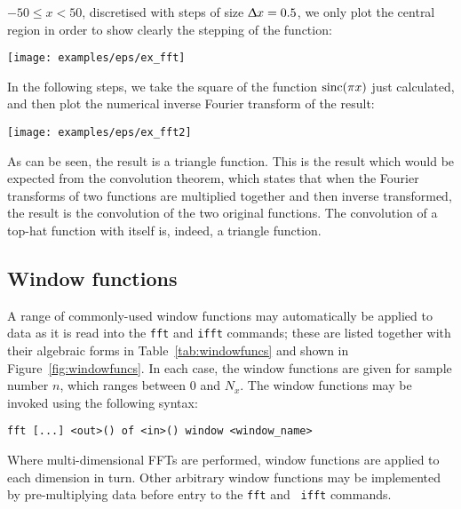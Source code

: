 {$-50\leq x<50$, discretised with steps of size $\Updelta x=0.5$, we only plot
the central region in order to show clearly the stepping of the function:
\nlscf
\begin{center}
\texttt{[image: examples/eps/ex\_fft]}
\end{center}
\nlscf
In the following steps, we take the square of the function ${\rm sinc}(\pi x)$ just
calculated, and then plot the numerical inverse Fourier transform of the
result:
\nlscf
{}\newline
{}\newline
{}
\nlscf
\begin{center}
\texttt{[image: examples/eps/ex\_fft2]}
\end{center}
\nlscf
As can be seen, the result is a triangle function. This is the result which
would be expected from the convolution theorem, which states that when the
Fourier transforms of two functions are multiplied together and then inverse
transformed, the result is the convolution of the two original functions. The
convolution of a top-hat function with itself is, indeed, a triangle function.
}

\subsection{Window functions}

A range of commonly-used window functions may automatically be applied to data
as it is read into the {\tt fft} and {\tt ifft} commands; these are listed
together with their algebraic forms in Table~\ref{tab:windowfuncs} and shown in
Figure~\ref{fig:windowfuncs}. In each case, the window functions are given for
sample number $n$, which ranges between $0$ and $N_x$. The window functions may
be invoked using the following syntax:

\begin{verbatim}
fft [...] <out>() of <in>() window <window_name>
\end{verbatim}

\noindent Where multi-dimensional FFTs are performed, window functions are
applied to each dimension in turn.  Other arbitrary window functions may be
implemented by pre-multiplying data before entry to the {\tt fft} and {\tt
ifft} commands.

\newlength{\wfgap}
\setlength{\wfgap}{30pt}

